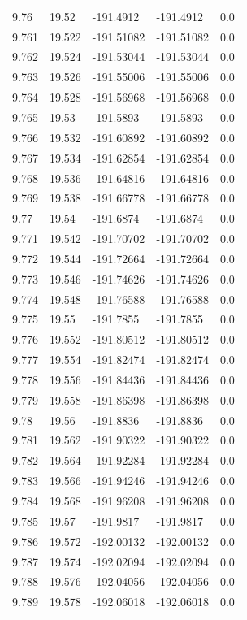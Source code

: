 \begin{tabular}{lllll}
9.76 & 19.52 & -191.4912 & -191.4912 & 0.0 \\
9.761 & 19.522 & -191.51082 & -191.51082 & 0.0 \\
9.762 & 19.524 & -191.53044 & -191.53044 & 0.0 \\
9.763 & 19.526 & -191.55006 & -191.55006 & 0.0 \\
9.764 & 19.528 & -191.56968 & -191.56968 & 0.0 \\
9.765 & 19.53 & -191.5893 & -191.5893 & 0.0 \\
9.766 & 19.532 & -191.60892 & -191.60892 & 0.0 \\
9.767 & 19.534 & -191.62854 & -191.62854 & 0.0 \\
9.768 & 19.536 & -191.64816 & -191.64816 & 0.0 \\
9.769 & 19.538 & -191.66778 & -191.66778 & 0.0 \\
9.77 & 19.54 & -191.6874 & -191.6874 & 0.0 \\
9.771 & 19.542 & -191.70702 & -191.70702 & 0.0 \\
9.772 & 19.544 & -191.72664 & -191.72664 & 0.0 \\
9.773 & 19.546 & -191.74626 & -191.74626 & 0.0 \\
9.774 & 19.548 & -191.76588 & -191.76588 & 0.0 \\
9.775 & 19.55 & -191.7855 & -191.7855 & 0.0 \\
9.776 & 19.552 & -191.80512 & -191.80512 & 0.0 \\
9.777 & 19.554 & -191.82474 & -191.82474 & 0.0 \\
9.778 & 19.556 & -191.84436 & -191.84436 & 0.0 \\
9.779 & 19.558 & -191.86398 & -191.86398 & 0.0 \\
9.78 & 19.56 & -191.8836 & -191.8836 & 0.0 \\
9.781 & 19.562 & -191.90322 & -191.90322 & 0.0 \\
9.782 & 19.564 & -191.92284 & -191.92284 & 0.0 \\
9.783 & 19.566 & -191.94246 & -191.94246 & 0.0 \\
9.784 & 19.568 & -191.96208 & -191.96208 & 0.0 \\
9.785 & 19.57 & -191.9817 & -191.9817 & 0.0 \\
9.786 & 19.572 & -192.00132 & -192.00132 & 0.0 \\
9.787 & 19.574 & -192.02094 & -192.02094 & 0.0 \\
9.788 & 19.576 & -192.04056 & -192.04056 & 0.0 \\
9.789 & 19.578 & -192.06018 & -192.06018 & 0.0 \\

\end{tabular}
